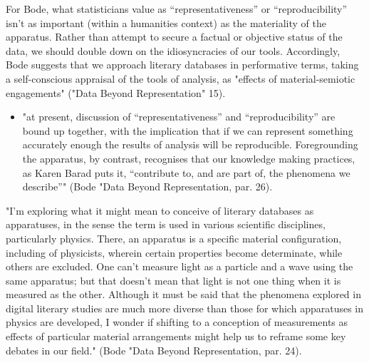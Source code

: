 \documentclass[11pt]{article}
\begin{document}
For Bode, what statisticians value as “representativeness” or
“reproducibility” isn’t as important (within a humanities context) as
the materiality of the apparatus. Rather than attempt to secure a
factual or objective status of the data, we should double down on the
idiosyncracies of our tools. Accordingly, Bode suggests that we
approach literary databases in performative terms, taking a
self-conscious appraisal of the tools of analysis, as "effects of
material-semiotic engagements" ("Data Beyond Representation" 15).
\begin{itemize}
\item "at present, discussion of “representativeness” and
“reproducibility” are bound up together, with the implication that
if we can represent something accurately enough the results of
analysis will be reproducible. Foregrounding the apparatus, by
contrast, recognises that our knowledge making practices, as Karen
Barad puts it, “contribute to, and are part of, the phenomena we
describe”" (Bode "Data Beyond Representation, par. 26).
\end{itemize}

"I’m exploring what it might mean to conceive of literary databases as
apparatuses, in the sense the term is used in various scientific
disciplines, particularly physics. There, an apparatus is a specific
material configuration, including of physicists, wherein certain
properties become determinate, while others are excluded. One can’t
measure light as a particle and a wave using the same apparatus; but
that doesn’t mean that light is not one thing when it is measured as
the other. Although it must be said that the phenomena explored in
digital literary studies are much more diverse than those for which
apparatuses in physics are developed, I wonder if shifting to a
conception of measurements as effects of particular material
arrangements might help us to reframe some key debates in our field."
(Bode "Data Beyond Representation, par. 24).
\end{document}

